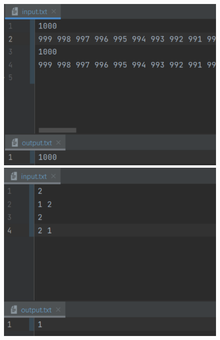 \begin{figure}[H]
        \label{pic3}
	\includegraphics[scale=0.7]{fig/4_max.png}
	\includegraphics[scale=0.7]{fig/4_min.png}
\end{figure}

